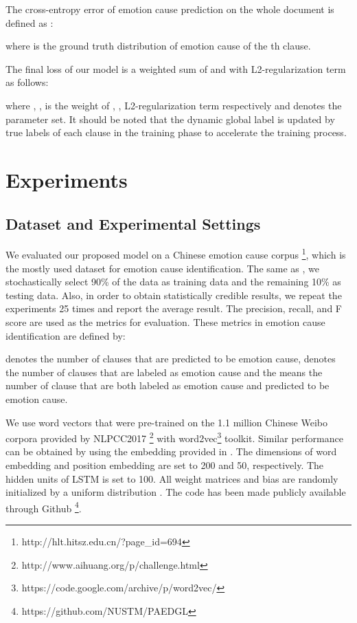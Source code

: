 \documentclass[letterpaper]{article} \usepackage{aaai19}  \usepackage{times}  \usepackage{helvet}  \usepackage{courier}  \usepackage{url}  \usepackage{graphicx}  \frenchspacing  \setlength{\pdfpagewidth}{8.5in}  \setlength{\pdfpageheight}{11in}  \setcounter{secnumdepth}{0}
\begin{document}
The cross-entropy error of emotion cause prediction on the whole document is defined as :

where  is the ground truth distribution of emotion cause of the th clause.



The final loss of our model is a weighted sum of  and  with L2-regularization term as follows:

where , ,  is the weight of , , L2-regularization term respectively and  denotes the parameter set.
It should be noted that the dynamic global label is updated by true labels of each clause in the training phase to accelerate the training process.

\section{Experiments}
\subsection{Dataset and Experimental Settings}

We evaluated our proposed model on a Chinese emotion cause corpus \cite{gui2016event} \footnote{http://hlt.hitsz.edu.cn/?page\_id=694}, which is the mostly used dataset for emotion cause identification. The same as \cite{gui2017question}, we stochastically select 90\% of the data as training data and the remaining 10\% as testing data. Also, in order to obtain statistically credible results, we repeat the experiments 25 times and report the average result.
The precision, recall, and F score are used as the metrics for evaluation. These metrics in emotion cause identification are defined by:



 denotes the number of clauses that are predicted to be emotion cause,  denotes the number of clauses that are labeled as emotion cause and the  means the number of clause that are both labeled as emotion cause and predicted to be emotion cause.

We use word vectors that were pre-trained on the 1.1 million Chinese Weibo corpora provided by NLPCC2017 \footnote{http://www.aihuang.org/p/challenge.html} with word2vec\footnote{ https://code.google.com/archive/p/word2vec/} \cite{mikolov2013distributed} toolkit. Similar performance can be obtained by using the embedding provided in \cite{gui2017question}. The dimensions of word embedding and position embedding are set to 200 and 50, respectively. The hidden units of LSTM is set to 100. All weight matrices and bias are randomly initialized by a uniform distribution . The code has been made publicly available through Github \footnote{https://github.com/NUSTM/PAEDGL}.
\end{document}
